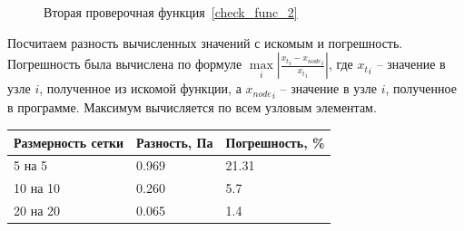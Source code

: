 \documentclass[a4paper,14pt]{extarticle}
\begin{document}
\begin{figure}[!htbp]
	\caption{Вторая проверочная функция~\eqref{check_func_2}}
	\label{check_func_2_pic}
\end{figure}

\newpage

Посчитаем разность вычисленных значений с искомым и погрешность. Погрешность была вычислена по формуле $\underset{i}{\max} | \frac{{x_t}_i - {x_{node}}_i}{{x_t}_i} |$, где ${x_t}_i$ -- значение в узле $i$, полученное из искомой функции, а ${x_{node}}_i$ -- значение в узле $i$, полученное в программе. Максимум вычисляется по всем узловым элементам.

\begin{table}[!htbp]
	\begin{tabular}{|l|l|l|}
		\hline
		\multicolumn{1}{|c|}{Размерность сетки} & \multicolumn{1}{c|}{Разность, Па} & Погрешность, \% \\ \hline
		5 на 5                                  & 0.969                              & 21.31            \\ \hline
		10 на 10                                & 0.260                              & 5.7            \\ \hline
		20 на 20                                & 0.065                              & 1.4            \\ \hline
	\end{tabular}
\end{table}

\newpage
\end{document}

